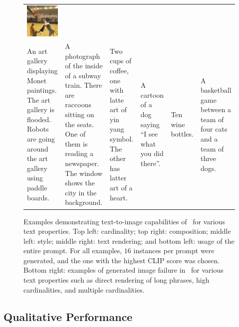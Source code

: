 \begin{figure}
\begin{tabular}{p{25mm}p{25mm}p{25mm}|p{25mm}p{25mm}p{25mm}}
    \includegraphics[width=26mm]{figs/failures/failure_00060_maskgit_sresg1r1}
    \\
    \tiny An art gallery displaying Monet paintings. The art gallery is flooded. Robots are going around the art gallery using paddle boards. &
    \tiny A photograph of the inside of a subway train. There are raccoons sitting on the seats. One of them is reading a newspaper. The window shows the city in the background. &
    \tiny Two cups of coffee, one with latte art of yin yang symbol. The other has latter art of a heart. &
    \tiny A cartoon of a dog saying ``I see what you did there''. &
    \tiny Ten wine bottles. &
    \tiny A basketball game between a team of four cats and a team of three dogs.
    \\
  \end{tabular}
  \caption{\small Examples demonstrating text-to-image capabilities of \name~for various text properties. Top left: cardinality; top right: composition; middle left: style; middle right: text rendering; and bottom left: usage of the entire prompt. For all examples, $16$ instances per prompt were generated, and the one with the highest CLIP score \citep{clip} was chosen. Bottom right: examples of generated image failure in \name~for various text properties such as direct rendering of long phrases, high cardinalities, and multiple cardinalities.}
  \label{fig:text_class_examples}
\end{figure}



\subsection{Qualitative Performance}

